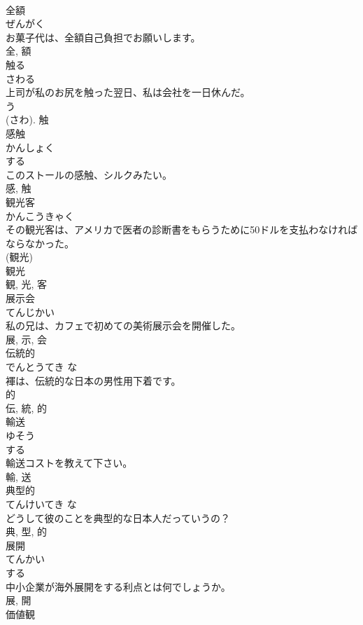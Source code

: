 \documentclass[8pt]{extreport}
\begin{document}
\begin{CJK}{UTF8}{min}
\\	全額	
\\	ぜんがく	
\\	お菓子代は、全額自己負担でお願いします。	
\\	全, 額	
\\	触る	
\\	さわる	
\\	上司が私のお尻を触った翌日、私は会社を一日休んだ。	
\\	う 
\\	(さわ).	触	
\\	感触	
\\	かんしょく	
\\	する 
\\	このストールの感触、シルクみたい。	
\\	感, 触	
\\	観光客	
\\	かんこうきゃく	
\\	その観光客は、アメリカで医者の診断書をもらうために50ドルを支払わなければならなかった。	
\\	(観光) 
\\	観光 
\\	観, 光, 客	
\\	展示会	
\\	てんじかい	
\\	私の兄は、カフェで初めての美術展示会を開催した。	
\\	展, 示, 会	
\\	伝統的	
\\	でんとうてき	な 
\\	褌は、伝統的な日本の男性用下着です。	
\\	的 
\\	伝, 統, 的	
\\	輸送	
\\	ゆそう	
\\	する 
\\	輸送コストを教えて下さい。	
\\	輸, 送	
\\	典型的	
\\	てんけいてき	な 
\\	どうして彼のことを典型的な日本人だっていうの？	
\\	典, 型, 的	
\\	展開	
\\	てんかい	
\\	する 
\\	中小企業が海外展開をする利点とは何でしょうか。	
\\	展, 開	
\\	価値観	

\end{CJK}
\end{document}
